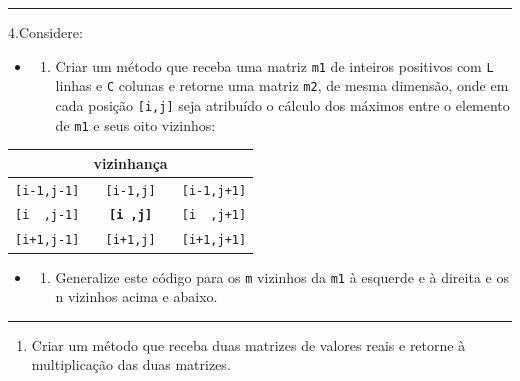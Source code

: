 \documentclass[12pt,a4paper]{article}
\providecommand{\tightlist}{%
      \setlength{\itemsep}{0pt}\setlength{\parskip}{0pt}}
\begin{document}
    \begin{center}\rule{0.5\linewidth}{0.5pt}\end{center}

4.Considere:

\begin{itemize}
\item
  \begin{enumerate}
  \def\labelenumi{\alph{enumi})}
  \tightlist
  \item
    Criar um método que receba uma matriz \texttt{m1} de inteiros
    positivos com \texttt{L} linhas e \texttt{C} colunas e retorne uma
    matriz \texttt{m2}, de mesma dimensão, onde em cada posição
    \texttt{{[}i,j{]}} seja atribuído o cálculo dos máximos entre o
    elemento de \texttt{m1} e seus oito vizinhos:
  \end{enumerate}
\end{itemize}

\begin{longtable}[]{@{}ccc@{}}
\toprule()
& vizinhança & \\
\midrule()
\endhead
\texttt{{[}i-1,j-1{]}} & \texttt{{[}i-1,j{]}} &
\texttt{{[}i-1,j+1{]}} \\
\texttt{{[}i\ \ ,j-1{]}} & \textbf{\texttt{{[}i\ ,j{]}}} &
\texttt{{[}i\ \ ,j+1{]}} \\
\texttt{{[}i+1,j-1{]}} & \texttt{{[}i+1,j{]}} &
\texttt{{[}i+1,j+1{]}} \\
\bottomrule()
\end{longtable}

\begin{itemize}
\item
  \begin{enumerate}
  \def\labelenumi{\alph{enumi})}
  \setcounter{enumi}{1}
  \tightlist
  \item
    Generalize este código para os \texttt{m} vizinhos da \texttt{m1} à
    esquerde e à direita e os n vizinhos acima e abaixo.
  \end{enumerate}
\end{itemize}

    \begin{center}\rule{0.5\linewidth}{0.5pt}\end{center}

\begin{enumerate}
\def\labelenumi{\arabic{enumi}.}
\setcounter{enumi}{4}
\tightlist
\item
  Criar um método que receba duas matrizes de valores reais e retorne à
  multiplicação das duas matrizes.
\end{enumerate}
\end{document}

